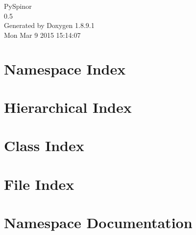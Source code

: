 \documentclass[twoside]{book}
\newcommand{\+}{\discretionary{\mbox{\scriptsize$\hookleftarrow$}}{}{}}
\newcommand{\clearemptydoublepage}{%
  \newpage{\pagestyle{empty}\cleardoublepage}%
}
\begin{document}
\hypersetup{pageanchor=false,
             bookmarks=true,
             bookmarksnumbered=true,
             pdfencoding=unicode
            }
\begin{titlepage}
\vspace*{7cm}
\begin{center}%
{\Large Py\+Spinor \\[1ex]\large 0.\+5 }\\
\vspace*{1cm}
{\large Generated by Doxygen 1.8.9.1}\\
\vspace*{0.5cm}
{\small Mon Mar 9 2015 15:14:07}\\
\end{center}
\end{titlepage}
\clearemptydoublepage
\tableofcontents
\clearemptydoublepage
{}
\hypersetup{pageanchor=true}

\chapter{Namespace Index}

\chapter{Hierarchical Index}

\chapter{Class Index}

\chapter{File Index}

\chapter{Namespace Documentation}













\end{document}
